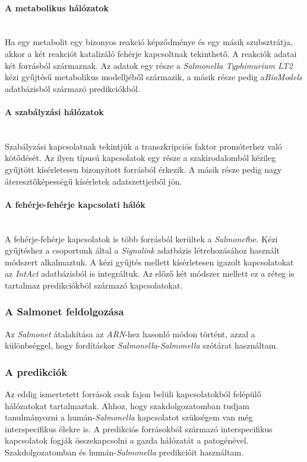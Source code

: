 \documentclass[a4paper,12pt]{article}
\begin{document}
			\paragraph{A metabolikus hálózatok} \mbox{}\\
				Ha egy metabolit egy bizonyos reakció képződménye és egy másik szubsztrátja, akkor a két reakciót katalizáló fehérje kapcsoltnak tekinthető. A reakciók adatai két forrásból származnak. Az adatok egy része a \textit{Salmonella Typhimurium LT2} kézi gyűjtésű metabolikus modelljéből származik, a másik része pedig a\textit{BioModels} adatbázisból származó predikciókból. \cite{salmonet}
				
			\paragraph{A szabályzási hálózatok} \mbox{}\\
				Szabályzási kapcsolatnak tekintjük a transzkripciós faktor promóterhez való kötődését. Az ilyen típusú kapcsolatok egy része a szakirodalomból kézileg gyűjtött kísérletesen bizonyított forrásból érkezik. A másik része pedig nagy áteresztőképességű kísérletek adatszettjeiből jön.  \cite{salmonet}
				
			\paragraph{A fehérje-fehérje kapcsolati hálók} \mbox{}\\
				A fehérje-fehérje kapcsolatok is több forrásból kerültek a \textit{Salmonet}be. Kézi gyűjtéshez a csoportunk által a \textit{Signalink} adatbázis létrehozásához használt módszert alkalmaztuk. A kézi gyűjtés mellett kísérletesen igazolt kapcsolatokat az \textit{IntAct} adatbázisból is integráltuk. Az előző két módszer mellett ez a réteg is tartalmaz predikciókból származó kapcsolatokat. 
				\cite{salmonet}
			
			\subsubsection{A Salmonet feldolgozása}
			Az \textit{Salmonet} átalakítása az \textit{ARN}-hez hasonló módon történt, azzal a különbséggel, hogy fordításkor \textit{Salmonella}-\textit{Salmonella} szótárat használtam.

			\subsubsection{A predikciók}
			Az eddig ismertetett források csak fajon belüli kapcsolatokból felépülő hálózatokat tartalmaztak. Ahhoz, hogy szakdolgozatomban tudjam tanulmányozni a humán-\textit{Salmonella} kapcsolatot szükségem van még interspecifikus élekre is. A predikciós forrásokból származó interspecifikus kapcsolatok fogják összekapcsolni a gazda hálózatát a patogénével. Szakdolgozatomban \cite{Krishnadev} és \cite{Kshirsagar} humán-\textit{Salmonella} predikcióit használtam.
			
\end{document}

